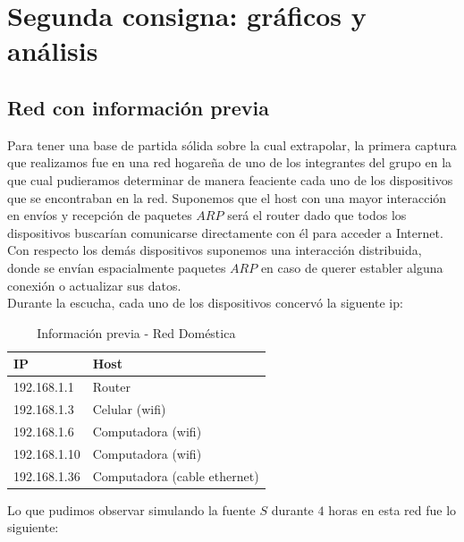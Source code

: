 \section{Segunda consigna: gráficos y análisis}

\subsection{Red con información previa}
Para tener una base de partida sólida sobre la cual extrapolar, la primera captura que realizamos fue en una red hogareña de uno de los integrantes 
del grupo en la que cual pudieramos determinar de manera feaciente cada uno de los dispositivos que se encontraban en la red. Suponemos que el host
con una mayor interacción en envíos y recepción de paquetes $ARP$ será el router dado que todos los dispositivos buscarían comunicarse directamente
con él para acceder a Internet. Con respecto los demás dispositivos suponemos una interacción distribuida, donde se envían espacialmente paquetes $ARP$
en caso de querer establer alguna conexión o actualizar sus datos.\\

Durante la escucha, cada uno de los dispositivos concervó la siguente ip:\\
\begin{table}[htb]
\begin{center}
\begin{tabular}{|l|l|}
\hline
IP & Host \\
\hline \hline
192.168.1.1 & Router \\ \hline
192.168.1.3 & Celular (wifi) \\ \hline
192.168.1.6 & Computadora (wifi)  \\ \hline
192.168.1.10 & Computadora (wifi) \\ \hline
192.168.1.36 & Computadora (cable ethernet) \\ \hline
\end{tabular}
\caption{Información previa - Red Doméstica}
\label{tabla informacion}
\end{center}
\end{table}


Lo que pudimos observar simulando la fuente $S$ durante $4$ horas en esta red fue lo siguiente:\\

